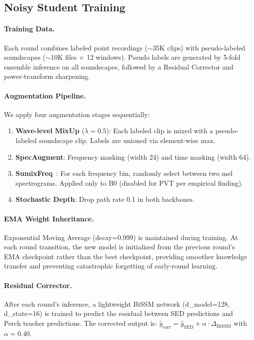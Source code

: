 \documentclass[a4paper]{article}
\begin{document}
\subsection{Noisy Student Training}
\label{sec:ns}

\paragraph{Training Data.}
Each round combines labeled point recordings ($\sim$35K clips) with pseudo-labeled soundscapes ($\sim$10K files $\times$ 12 windows).
Pseudo labels are generated by 5-fold ensemble inference on all soundscapes, followed by a Residual Corrector and power-transform sharpening.

\paragraph{Augmentation Pipeline.}
We apply four augmentation stages sequentially:
\begin{enumerate}[nosep]
    \item \textbf{Wave-level MixUp} ($\lambda=0.5$): Each labeled clip is mixed with a pseudo-labeled soundscape clip. Labels are unioned via element-wise max.
    \item \textbf{SpecAugment}: Frequency masking (width 24) and time masking (width 64).
    \item \textbf{SumixFreq}~\citep{babych2025}: For each frequency bin, randomly select between two mel spectrograms. Applied only to B0 (disabled for PVT per empirical finding).
    \item \textbf{Stochastic Depth}: Drop path rate 0.1 in both backbones.
\end{enumerate}

\paragraph{EMA Weight Inheritance.}
Exponential Moving Average (decay=0.999) is maintained during training.
At each round transition, the new model is initialized from the previous round's EMA checkpoint rather than the best checkpoint, providing smoother knowledge transfer and preventing catastrophic forgetting of early-round learning.

\paragraph{Residual Corrector.}
After each round's inference, a lightweight BiSSM network (d\_model=128, d\_state=16) is trained to predict the residual between SED predictions and Perch teacher predictions.
The corrected output is: $\hat{y}_\text{corr} = \hat{y}_\text{SED} + \alpha \cdot \Delta_\text{BiSSM}$ with $\alpha=0.40$.
\end{document}
